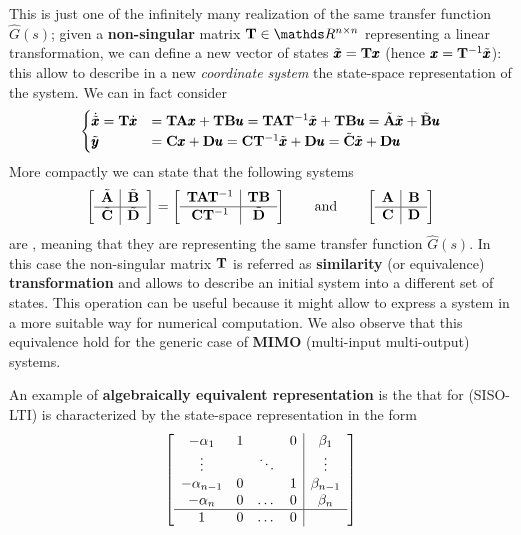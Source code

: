 	This is just one of the infinitely many realization of the same transfer function $\hat G(s)$; given a \textbf{non-singular} matrix $\mat T \in \mathds R^{n\times n}$ representing a linear transformation, we can define a new vector of states $\tilde {\pmb{x}} = \mathbf{T} \pmb{x}$ (hence $\pmb{x} = \mathbf{T}^{-1} \tilde {\pmb{x}}$): this allow to describe in a new \textit{coordinate system} the state-space representation of the system. We can in fact consider
	\[ \begin{cases}
		\dot{\tilde {\pmb{x}}} = \mathbf{T}\dot{\pmb{x}} & = \mathbf{T} \mathbf{A} \pmb{x} + \mathbf{T} \mathbf{B} \pmb{u} = \mathbf{T} \mathbf{A} \mathbf{T}^{-1} \tilde {\pmb{x}} + \mathbf{T} \mathbf{B} \pmb{u} = \tilde {\mathbf{A}} \tilde {\pmb{x}} + \tilde {\mathbf{B}} \pmb{u} \\
		\tilde {\pmb{y}} & = \mathbf{C} \pmb{x} + \mathbf{D} \pmb{u} = \mathbf{C} \mathbf{T}^{-1} \tilde {\pmb{x}} + \mathbf{D} \pmb{u} = \tilde {\mathbf{C}} \tilde {\pmb{x}} + \mathbf{D} \pmb{u}
	\end{cases} \]
	More compactly we can state that the following systems
	\begin{equation} \label{eq:dynsys:algebraicequivalence}
		\begin{bmatrix} \begin{array}{c|c}
				\tilde {\mathbf{A}} &  \tilde {\mathbf{B}} \\ \hline \tilde {\mathbf{C}} & \tilde {\mathbf{D}}
		\end{array} \end{bmatrix} = 
		\begin{bmatrix} \begin{array}{c|c}
			\mathbf{T} \mathbf{A} \mathbf{T}^{-1} &  \mathbf{T} \mathbf{B} \\ \hline \mathbf{C} \mathbf{T}^{-1} & \tilde {\mathbf{D}}
		\end{array} \end{bmatrix} 
		\qquad \textrm{and} \qquad 
		\begin{bmatrix} \begin{array}{c|c}
				\mathbf{A} &  \mathbf{B} \\ \hline \mathbf{C} & \mathbf{D}
		\end{array} \end{bmatrix}
	\end{equation}
	are , meaning that they are representing the same transfer function $\hat G(s)$. In this case the non-singular matrix $\mathbf{T}$ is referred as \textbf{similarity} (or equivalence) \textbf{transformation} and allows to describe an initial system into a different set of states. This operation can be useful because it might allow to express a system in a more suitable way for numerical computation. We also observe that this equivalence hold for the generic case of \textbf{MIMO} (multi-input multi-output) systems.
	
	An example of \textbf{algebraically equivalent representation} is the  that for (SISO-LTI) is characterized by the state-space representation in the form
	\begin{equation}
	\begin{bmatrix} \begin{array}{c c c c | c}
		-\alpha_1 & 1 & & 0 & \beta_1 \\ 
		\vdots & & \ddots && \vdots \\
		-\alpha_{n-1} & 0 & & 1 & \beta_{n-1} \\
		-\alpha_n & 0 & \dots & 0 & \beta_n \\ \hline
		1 & 0 & \dots & 0 
	\end{array} \end{bmatrix}
	\end{equation}
	
	
	
	
	
	
	
	
	
	
	
	
	
	
	
	
	
	
	
	
	
	
	
	
	
	
